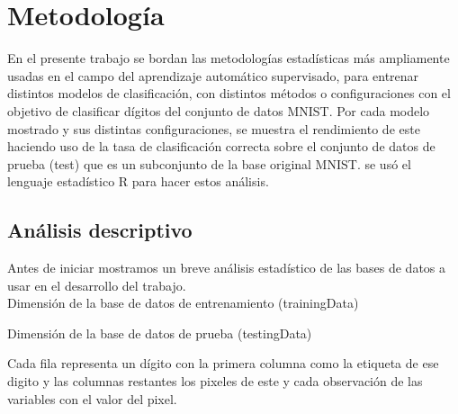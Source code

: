\documentclass{article}
\begin{document}
\section{Metodología}
En el presente trabajo se bordan las metodologías estadísticas más ampliamente usadas en el campo del aprendizaje automático supervisado, para entrenar distintos modelos de clasificación, con distintos métodos o configuraciones con el objetivo de clasificar dígitos del conjunto de datos MNIST. Por cada modelo mostrado y sus distintas configuraciones, se muestra el rendimiento de este haciendo uso de la tasa de clasificación correcta sobre el conjunto de datos de prueba (test) que es un subconjunto de la base original MNIST. se usó el lenguaje estadístico R para hacer estos análisis.  

\subsection{Análisis descriptivo}

Antes de iniciar mostramos un breve análisis estadístico de las bases de datos a usar en el desarrollo del trabajo.\\

Dimensión de la base de datos de entrenamiento (trainingData)

\begin{table}[ht]
	\caption{\small{Dimensión de la base de datos trainingData.}}
	\label{tabla1}
\end{table}

Dimensión de la base de datos de prueba (testingData)

\begin{table}[ht]
	\caption{\small{Dimensión de la base de datos testingData.}}
	\label{tabla1}
\end{table}

Cada fila representa un dígito con la primera columna como la etiqueta de ese digito y las columnas restantes los pixeles de este y cada observación de las variables con el valor del pixel.\\
\end{document}
